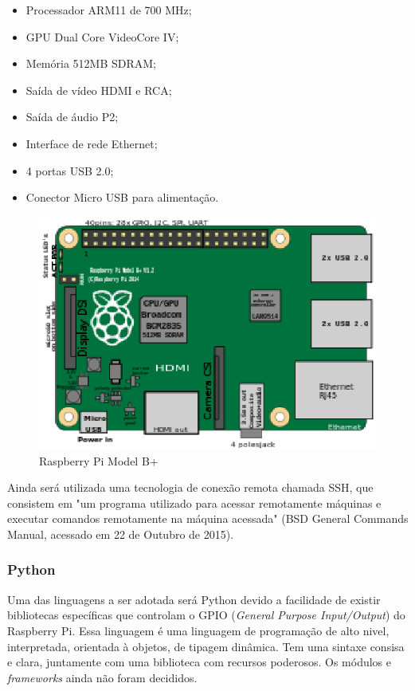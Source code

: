 \begin{itemize}
	\item Processador ARM11 de 700 MHz;
	\item GPU Dual Core VideoCore IV;
	\item Memória 512MB SDRAM;
	\item Saída de vídeo HDMI e RCA;
	\item Saída de áudio P2;
	\item Interface de rede Ethernet;
	\item 4 portas USB 2.0;
	\item Conector Micro USB para alimentação.
\end{itemize}

\begin{figure}[!htb]
	\centering
	\includegraphics[keepaspectratio=true,scale=0.5]{figuras/referencialteorico/raspberry.eps}
	\caption{Raspberry Pi Model B+}
	\label{rasp}
\end{figure}

Ainda será utilizada uma tecnologia de conexão remota chamada SSH, que consistem em "um programa utilizado para acessar remotamente máquinas e executar comandos remotamente na máquina acessada" (BSD General Commands Manual, acessado em 22 de Outubro de 2015).

\subsubsection{Python}

Uma das linguagens a ser adotada será Python devido a facilidade de existir bibliotecas específicas que controlam o GPIO (\textit{General Purpose Input/Output}) do Raspberry Pi. Essa linguagem é uma linguagem de programação de alto nivel, interpretada, orientada à objetos, de tipagem dinâmica. Tem uma sintaxe consisa e clara, juntamente com uma biblioteca com recursos poderosos. Os módulos e \textit{frameworks} ainda não foram decididos.

